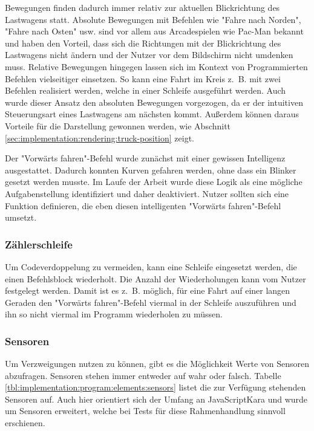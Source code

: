 Bewegungen finden dadurch immer relativ zur aktuellen Blickrichtung des Lastwagens statt. Absolute Bewegungen mit Befehlen wie "Fahre nach Norden", "Fahre nach Osten" usw. sind vor allem aus Arcadespielen wie Pac-Man bekannt und haben den Vorteil, dass sich die Richtungen mit der Blickrichtung des Lastwagens nicht ändern und der Nutzer vor dem Bildschirm nicht umdenken muss. Relative Bewegungen hingegen lassen sich im Kontext von Programmierten Befehlen vielseitiger einsetzen. So kann eine Fahrt im Kreis z.~B. mit zwei Befehlen realisiert werden, welche in einer Schleife ausgeführt werden. Auch wurde dieser Ansatz den absoluten Bewegungen vorgezogen, da er der intuitiven Steuerungsart eines Lastwagens am nächsten kommt. Außerdem können daraus Vorteile für die Darstellung gewonnen werden, wie Abschnitt \ref{sec:implementation:rendering:truck-position} zeigt.

Der "Vorwärts fahren"-Befehl wurde zunächst mit einer gewissen Intelligenz ausgestattet. Dadurch konnten Kurven gefahren werden, ohne dass ein Blinker gesetzt werden musste. Im Laufe der Arbeit wurde diese Logik als eine mögliche Aufgabenstellung identifiziert und daher deaktiviert. Nutzer sollten sich eine Funktion definieren, die eben diesen intelligenten "Vorwärts fahren"-Befehl umsetzt.

\subsubsection{Zählerschleife}
\label{sec:implementation:program:elements:for}

Um Codeverdoppelung zu vermeiden, kann eine Schleife eingesetzt werden, die einen Befehlsblock wiederholt. Die Anzahl der Wiederholungen kann vom Nutzer festgelegt werden. Damit ist es z.~B. möglich, für eine Fahrt auf einer langen Geraden den "Vorwärts fahren"-Befehl viermal in der Schleife auszuführen und ihn so nicht viermal im Programm wiederholen zu müssen.

\subsubsection{Sensoren}
\label{sec:implementation:program:elements:sensors}

Um Verzweigungen nutzen zu können, gibt es die Möglichkeit Werte von Sensoren abzufragen. Sensoren stehen immer entweder auf wahr oder falsch. Tabelle \ref{tbl:implementation:program:elements:sensors} listet die zur Verfügung stehenden Sensoren auf. Auch hier orientiert sich der Umfang an JavaScriptKara und wurde um Sensoren erweitert, welche bei Tests für diese Rahmenhandlung sinnvoll erschienen.

